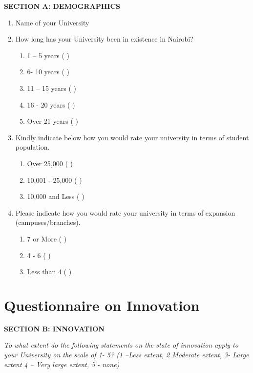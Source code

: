 \textbf{SECTION A: DEMOGRAPHICS}
\begin{enumerate}

\item  Name of your University 

\item How long has your University been in existence in Nairobi? 
\begin{enumerate}
\item  1 – 5 years ( ) 
\item  6- 10 years ( ) 
\item  11 – 15 years ( ) 
\item  16 - 20 years ( ) 
\item  Over 21 years ( ) 
\end{enumerate}

\item Kindly indicate below how you would rate your university in terms of student population. 
\begin{enumerate}
\item Over 25,000 ( ) 
\item 10,001 - 25,000 ( ) 
\item 10,000 and Less ( ) 
\end{enumerate}

\item Please indicate how you would rate your university in terms of expansion (campuses/branches). 
\begin{enumerate}
\item 7 or More ( ) 
\item 4 - 6 ( ) 
\item Less than 4 ( )
\end{enumerate}

\end{enumerate}

\section{\textbf{Questionnaire on Innovation}}
\textbf {SECTION B: INNOVATION}

\textit{To what extent do the following statements on the state of innovation apply to your University on the scale of 1- 5? (1 –Less extent, 2 Moderate extent, 3- Large extent 4 – Very large extent, 5 - none)}

